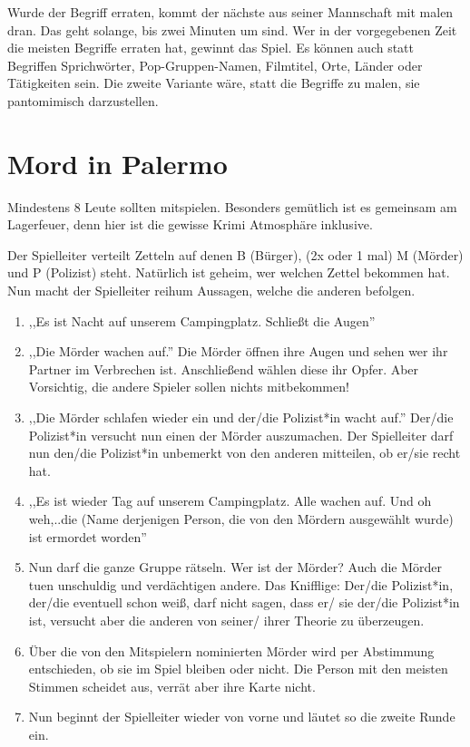 \documentclass[a4paper]{report}
\begin{document}
Wurde der Begriff erraten, kommt der nächste aus seiner Mannschaft mit malen dran. Das geht solange, bis zwei Minuten um sind. Wer in der vorgegebenen Zeit die meisten Begriffe erraten hat, gewinnt das Spiel. Es können auch statt Begriffen Sprichwörter, Pop-Gruppen-Namen, Filmtitel, Orte, Länder oder Tätigkeiten sein. Die zweite Variante wäre, statt die Begriffe zu malen, sie pantomimisch darzustellen.

\section*{Mord in Palermo}
Mindestens 8 Leute sollten mitspielen. Besonders gemütlich ist es gemeinsam am Lagerfeuer, denn hier ist die gewisse Krimi Atmosphäre inklusive.

Der Spielleiter verteilt Zetteln auf denen B (Bürger), (2x oder 1 mal) M (Mörder) und P (Polizist) steht. Natürlich ist geheim, wer welchen Zettel bekommen hat. Nun macht der Spielleiter reihum Aussagen, welche die anderen befolgen.

\begin{enumerate}
    \item ,,Es ist Nacht auf unserem Campingplatz. Schließt die Augen''
    \item ,,Die Mörder wachen auf.'' Die Mörder öffnen ihre Augen und sehen wer ihr Partner im Verbrechen ist. Anschließend wählen diese ihr Opfer. Aber Vorsichtig, die andere Spieler sollen nichts mitbekommen!
    \item ,,Die Mörder schlafen wieder ein und der/die Polizist*in wacht auf.'' Der/die Polizist*in versucht nun einen der Mörder auszumachen. Der Spielleiter darf nun den/die Polizist*in unbemerkt von den anderen mitteilen, ob er/sie recht hat.
    \item ,,Es ist wieder Tag auf unserem Campingplatz. Alle wachen auf. Und oh weh,..die (Name derjenigen Person, die von den Mördern ausgewählt wurde) ist ermordet worden''
    \item Nun darf die ganze Gruppe rätseln. Wer ist der Mörder? Auch die Mörder tuen unschuldig und verdächtigen andere. Das Knifflige: Der/die Polizist*in, der/die eventuell schon weiß, darf nicht sagen, dass er/ sie der/die Polizist*in ist, versucht aber die anderen von seiner/ ihrer Theorie zu überzeugen.
    \item Über die von den Mitspielern nominierten Mörder wird per Abstimmung entschieden, ob sie im Spiel bleiben oder nicht. Die Person mit den meisten Stimmen scheidet aus, verrät aber ihre Karte nicht.
    \item Nun beginnt der Spielleiter wieder von vorne und läutet so die zweite Runde ein.
\end{enumerate}
\end{document}
